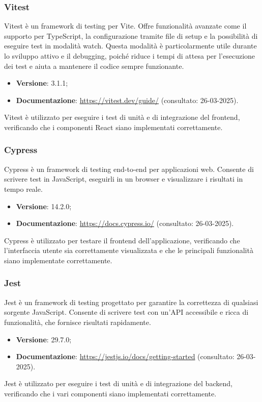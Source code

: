 \subsubsection{Vitest}
Vitest è un framework di testing per Vite. Offre funzionalità avanzate come il
supporto per TypeScript, la configurazione tramite file di setup e la
possibilità di eseguire test in modalità watch. Questa modalità è particolarmente utile
durante lo sviluppo attivo e il debugging, poiché riduce i tempi di attesa per
l'esecuzione dei test e aiuta a mantenere il codice sempre funzionante.
\begin{itemize}
    \item \textbf{Versione}: 3.1.1;
    \item \textbf{Documentazione}: \url{https://vitest.dev/guide/} (consultato:
          26-03-2025).
\end{itemize}
Vitest è utilizzato per eseguire i test di unità e di integrazione del frontend,
verificando che i componenti React siano implementati correttamente.

\subsubsection{Cypress}
Cypress è un framework di testing end-to-end per applicazioni web. Consente di
scrivere test in JavaScript, eseguirli in un browser e visualizzare i
risultati in tempo reale.
\begin{itemize}
    \item \textbf{Versione}: 14.2.0;
    \item \textbf{Documentazione}: \url{https://docs.cypress.io/} (consultato:
          26-03-2025).
\end{itemize}
Cypress è utilizzato per testare il frontend dell'applicazione, verificando che
l'interfaccia utente sia correttamente visualizzata e che le principali funzionalità
siano implementate correttamente.

\subsubsection{Jest}
Jest è un framework di testing progettato per garantire la correttezza di
qualsiasi sorgente JavaScript. Consente di scrivere test con un'API
accessibile e ricca di funzionalità, che fornisce risultati rapidamente.
\begin{itemize}
    \item \textbf{Versione}: 29.7.0;
    \item \textbf{Documentazione}: \url{https://jestjs.io/docs/getting-started} (consultato:
          26-03-2025).
\end{itemize}
Jest è utilizzato per eseguire i test di unità e di integrazione del backend,
verificando che i vari componenti siano implementati correttamente.